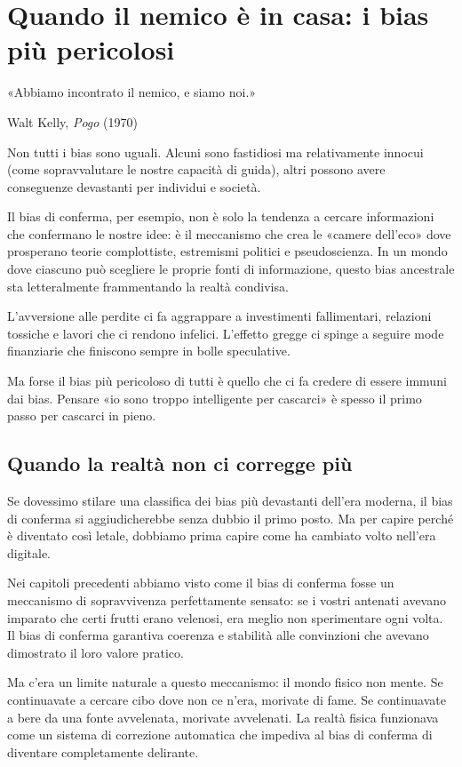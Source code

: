 \chapter{Quando il nemico è in casa: i bias più pericolosi}
\label{cap:p4c8}

\epigraph{«Abbiamo incontrato il nemico, e siamo noi.»}{Walt Kelly, \textit{Pogo} (1970)}

Non tutti i bias sono uguali. Alcuni sono fastidiosi ma relativamente innocui (come sopravvalutare le nostre capacità di guida), altri possono avere conseguenze devastanti per individui e società.

Il bias di conferma, per esempio, non è solo la tendenza a cercare informazioni che confermano le nostre idee: è il meccanismo che crea le «camere dell'eco» dove prosperano teorie complottiste, estremismi politici e pseudoscienza. In un mondo dove ciascuno può scegliere le proprie fonti di informazione, questo bias ancestrale sta letteralmente frammentando la realtà condivisa.

L'avversione alle perdite ci fa aggrappare a investimenti fallimentari, relazioni tossiche e lavori che ci rendono infelici. L'effetto gregge ci spinge a seguire mode finanziarie che finiscono sempre in bolle speculative.

Ma forse il bias più pericoloso di tutti è quello che ci fa credere di essere immuni dai bias. Pensare «io sono troppo intelligente per cascarci» è spesso il primo passo per cascarci in pieno.

\bigskip

\section{Quando la realtà non ci corregge più}
\label{sec:p4c8-quando-la-realta}
Se dovessimo stilare una classifica dei bias più devastanti dell'era moderna, il bias di conferma si aggiudicherebbe senza dubbio il primo posto. Ma per capire perché è diventato così letale, dobbiamo prima capire come ha cambiato volto nell'era digitale.

Nei capitoli precedenti abbiamo visto come il bias di conferma fosse un meccanismo di sopravvivenza perfettamente sensato: se i vostri antenati avevano imparato che certi frutti erano velenosi, era meglio non sperimentare ogni volta. Il bias di conferma garantiva coerenza e stabilità alle convinzioni che avevano dimostrato il loro valore pratico.

Ma c'era un limite naturale a questo meccanismo: il mondo fisico non mente. Se continuavate a cercare cibo dove non ce n'era, morivate di fame. Se continuavate a bere da una fonte avvelenata, morivate avvelenati. La realtà fisica funzionava come un sistema di correzione automatica che impediva al bias di conferma di diventare completamente delirante.

